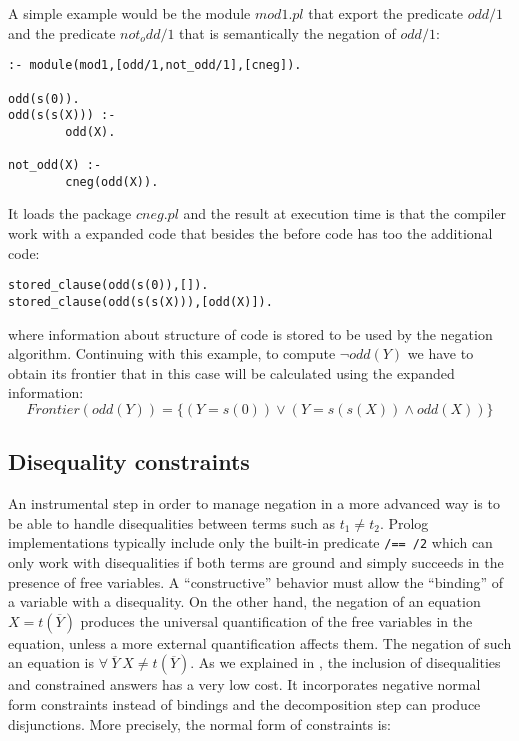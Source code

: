 \documentclass{llncs}
\begin{document}
A simple example would be the module $mod1.pl$ that export the predicate $odd/1$ and the predicate $not_odd/1$ that is semantically the negation of $odd/1$: 
\begin{verbatim}
:- module(mod1,[odd/1,not_odd/1],[cneg]).

odd(s(0)).
odd(s(s(X))) :- 
        odd(X).

not_odd(X) :- 
        cneg(odd(X)).
\end{verbatim}
It loads the package $cneg.pl$ and the result at execution time is
that the compiler work with a expanded code that besides the before
code has too the additional code:
\begin{verbatim}
stored_clause(odd(s(0)),[]).
stored_clause(odd(s(s(X))),[odd(X)]).
\end{verbatim}
where information about structure of code is stored to be used by the
negation algorithm. Continuing with this example, to compute $\neg
odd(Y)$ we have to obtain its frontier that in this case will be
calculated using the expanded information:
\[Frontier(odd(Y)) = \{ ( Y=s(0) ) \vee ( Y=s(s(X)) \wedge odd(X) ) \} \] 



\subsection{Disequality constraints}
\label{disequality}

An instrumental step in order to manage negation in a more advanced
way is to be able to handle disequalities between terms such as $t_1
\neq t_2$.  Prolog implementations typically include only the built-in
predicate {\tt /== /2} %
 which can only work with disequalities if both
terms are ground and simply succeeds in the presence of free variables.
A ``constructive'' behavior must allow the ``binding'' of a variable
with a disequality. On the other hand, the
negation of an equation $X = t(\overline{Y})$ produces the universal
quantification of the free variables in the equation, unless a more
external quantification affects them. The negation of such an equation
is $\forall~ \overline{Y}~X \neq t(\overline{Y})$.
As we explained in \cite{SusanaPADL2000}, the inclusion of
disequalities and constrained answers has a very low cost. It
incorporates negative normal form constraints instead of bindings and
the decomposition step can produce disjunctions. More precisely, the
normal form of constraints is:
\end{document}
